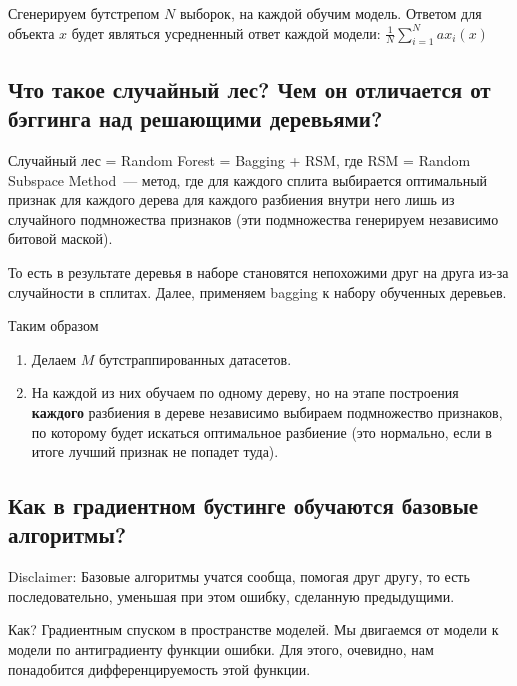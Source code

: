 Сгенерируем бутстрепом $N$ выборок, на каждой обучим модель. Ответом для объекта $x$ будет являться усредненный ответ каждой модели: $\frac{1}{N} \sum \limits_{i=1}^{N} a x_i(x)$













\subsection{Что такое случайный лес? Чем он отличается от бэггинга над решающими деревьями?}

Случайный лес = Random Forest = Bagging + RSM, где 
RSM = Random Subspace Method~--- метод, где для каждого сплита выбирается оптимальный признак для каждого дерева для каждого разбиения внутри него лишь из случайного подмножества признаков (эти подмножества генерируем независимо битовой маской).

То есть в результате деревья в наборе становятся непохожими друг на друга из-за случайности в сплитах. Далее, применяем bagging к набору обученных деревьев.

Таким образом
\begin{enumerate}
    \item Делаем $M$ бутстраппированных датасетов.
    \item На каждой из них обучаем по одному дереву, но на этапе построения \textbf{каждого} разбиения в дереве независимо выбираем подмножество признаков, по которому будет искаться оптимальное разбиение (это нормально, если в итоге лучший признак не попадет туда).
\end{enumerate}














\subsection{Как в градиентном бустинге обучаются базовые алгоритмы?}

Disclaimer: Базовые алгоритмы учатся сообща, помогая друг другу, то есть последовательно, уменьшая при этом ошибку, сделанную предыдущими.

Как? Градиентным спуском в пространстве моделей. Мы двигаемся от модели к модели по антиградиенту функции ошибки. Для этого, очевидно, нам понадобится дифференцируемость этой функции.

